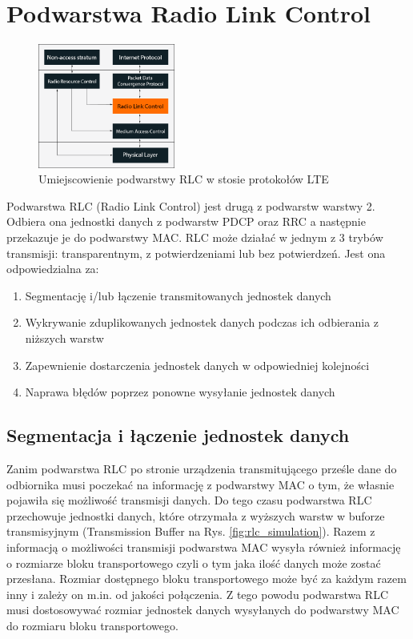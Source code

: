 \chapter{Podwarstwa Radio Link Control}
\label{cha:rlc}

\begin{figure}
	\centerline{\includegraphics[width=0.4\textwidth]{images/rlc_overview.png}}
	\caption{Umiejscowienie podwarstwy RLC w stosie protokołów LTE}
	\label{fig:rlc_overview}
\end{figure}

Podwarstwa RLC (Radio Link Control) jest drugą z podwarstw warstwy 2. Odbiera ona jednostki danych z podwarstw PDCP oraz RRC a następnie przekazuje je do podwarstwy MAC. RLC może działać w jednym z 3 trybów transmisji: transparentnym, z potwierdzeniami lub bez potwierdzeń. Jest ona odpowiedzialna za:

\begin{enumerate}
	\item Segmentację i/lub łączenie transmitowanych jednostek danych
	\item Wykrywanie zduplikowanych jednostek danych podczas ich odbierania z niższych warstw
	\item Zapewnienie dostarczenia jednostek danych w odpowiedniej kolejności
	\item Naprawa błędów poprzez ponowne wysyłanie jednostek danych
\end{enumerate}

\section{Segmentacja i łączenie jednostek danych}
\label{sec:segmentation}

Zanim podwarstwa RLC po stronie urządzenia transmitującego prześle dane do odbiornika musi poczekać na informację z podwarstwy MAC o tym, że własnie pojawiła się możliwość transmisji danych. Do tego czasu podwarstwa RLC przechowuje jednostki danych, które otrzymała z wyższych warstw w buforze transmisyjnym (Transmission Buffer na Rys. \ref{fig:rlc_simulation}). Razem z informacją o możliwości transmisji podwarstwa MAC wysyła również informację o rozmiarze bloku transportowego czyli o tym jaka ilość danych może zostać przesłana. Rozmiar dostępnego bloku transportowego może być za każdym razem inny i zależy on m.in. od jakości połączenia. Z tego powodu podwarstwa RLC musi dostosowywać rozmiar jednostek danych wysyłanych do podwarstwy MAC do rozmiaru bloku transportowego. \cite{Perez15}

